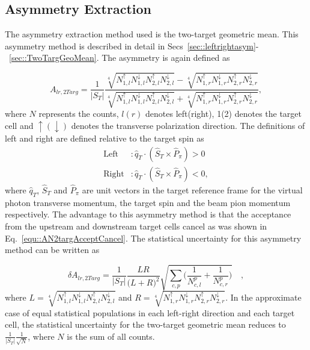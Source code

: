\subsection{Asymmetry Extraction}
The asymmetry extraction method used is the two-target geometric mean.  This
asymmetry method is described in detail in
Secs~\ref{sec::leftrightasym}-~\ref{sec::TwoTargGeoMean}.  The asymmetry is
again defined as

\begin{equation}
  \label{equ::AN4TargGeomeanJPsi}
  A_{lr,2Targ} =
  \frac{1}{|S_T|}
  \frac{ \sqrt[4]{ N_{1,l}^\uparrow N_{1, l}^\downarrow
      N_{2,l}^\uparrow N_{2, l}^\downarrow }
    - \sqrt[4]{ N_{1,r}^\uparrow N_{1,r}^\downarrow
      N_{2,r}^\uparrow N_{2,r}^\downarrow }
  }{
    \sqrt[4]{ N_{1,l}^\uparrow N_{1, l}^\downarrow
      N_{2,l}^\uparrow N_{2, l}^\downarrow }
    + \sqrt[4]{ N_{1,r}^\uparrow N_{1,r}^\downarrow
      N_{2,r}^\uparrow N_{2,r}^\downarrow } },
\end{equation}
\noindent
where $N$ represents the counts, $l(r)$ denotes left(right), 1(2) denotes the
target cell and $\uparrow(\downarrow)$ denotes the transverse polarization
direction.  The definitions of left and right are defined relative to the target
spin as
\begin{equation}
  \begin{aligned}
    \text{Left} &: \hat{q}_T \cdot (\hat{S}_T \times \hat{P}_{\pi}) > 0 \\
    \text{Right} &: \hat{q}_T \cdot (\hat{S}_T \times \hat{P}_{\pi}) < 0, 
  \end{aligned}
\end{equation}
\noindent
where $\hat{q}_T$, $\hat{S}_T$ and $\hat{P}_{\pi}$ are unit vectors in the
target reference frame for the virtual photon transverse momentum, the target
spin and the beam pion momentum respectively.  The advantage to this asymmetry
method is that the acceptance from the upstream and downstream target cells
cancel as was shown in Eq.~\ref{equ::AN2targAcceptCancel}.  The statistical
uncertainty for this asymmetry method can be written as

\begin{equation}
  \delta A_{lr,2Targ} = \frac{1}{|S_T|}
  \frac{LR}{\Big( L+R \Big)^2}
  \sqrt{
    \sum_{c,p}
    \Big(
    \frac{1}{N_{c,l}^{p}}
    + \frac{1}{N_{c,r}^p}
    \Big)
  } \quad,
\end{equation}
where $L =\sqrt[4]{N_{1,l}^\uparrow N_{1,l}^\downarrow N_{2,l}^\uparrow
  N_{2,l}^\downarrow}$ and $R =\sqrt[4]{N_{1,r}^\uparrow N_{1,r}^\downarrow
  N_{2,r}^\uparrow N_{2,r}^\downarrow}$.  In the approximate case of equal
statistical populations in each left-right direction and each target cell, the
statistical uncertainty for the two-target geometric mean reduces to
$\frac{1}{|S_T|}\frac{1}{\sqrt{N}}$, where $N$ is the sum of all counts.

